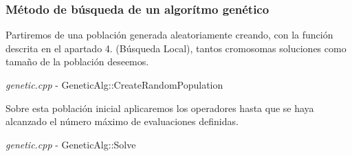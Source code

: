 \documentclass[a4paper, 12pt]{article}
\begin{document}
       \subsubsection*{Método de búsqueda de un algorítmo genético}
       Partiremos de una población generada aleatoriamente creando, con la función descrita en el apartado 4. (Búsqueda Local), tantos cromosomas soluciones como tamaño de la población deseemos.
       \begin{algorithm}
       	\caption{\textit{genetic.cpp} - GeneticAlg::CreateRandomPopulation}
       	
      \end{algorithm}
      
      \newpage
      Sobre esta población inicial aplicaremos los operadores hasta que se haya alcanzado el número máximo de evaluaciones definidas.
       \begin{algorithm}
       	\caption{\textit{genetic.cpp} - GeneticAlg::Solve}
       	
      \end{algorithm}
      
\end{document}
